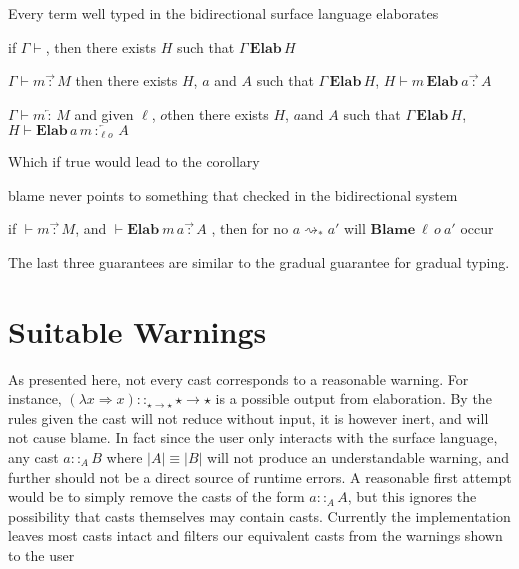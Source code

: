 \begin{conjecture}
Every term well typed in the bidirectional surface language elaborates 

if $\Gamma\vdash$, then there exists $H$ such that $\Gamma\,\textbf{Elab}\,H$ 

$\Gamma\vdash m\overrightarrow{\,:\,}M$ then there exists $H$, $a$
and $A$ such that $\Gamma\,\textbf{Elab}\,H$, $H\vdash m\,\textbf{Elab}\ a\overrightarrow{\,:\,}A$ 

$\Gamma\vdash m\overleftarrow{\,:\,}M$ and given $\ell$, $o$then
there exists $H$, $a$and $A$ such that $\Gamma\,\textbf{Elab}\,H$,
$H\vdash\textbf{Elab}\,a\,m\overleftarrow{\,:_{\ell o}\,}A$ 
\end{conjecture}

Which if true would lead to the corollary
\begin{conjecture}
blame never points to something that checked in the bidirectional
system 

if $\vdash m\overrightarrow{\,:\,}M$, and $\vdash\textbf{Elab}\ m\,a\overrightarrow{\,:\,}A$
, then for no $a\rightsquigarrow_{*}a'$ will $\textbf{Blame}\:\ensuremath{\ell}\,o\:a'$
occur 

\end{conjecture}

The last three guarantees are similar to the gradual guarantee \cite{siek_et_al:LIPIcs:2015:5031}
for gradual typing. 

\section{Suitable Warnings}

As presented here, not every cast corresponds to a reasonable warning.
For instance, $\left(\lambda x\Rightarrow x\right)::_{\star\rightarrow\star}\star\rightarrow\star$
is a possible output from elaboration. By the rules given the cast
will not reduce without input, it is however inert, and will not cause
blame. In fact since the user only interacts with the surface language,
any cast $a::_{A}B$ where $|A|\equiv|B|$ will not produce an understandable
warning, and further should not be a direct source of runtime errors.
A reasonable first attempt would be to simply remove the casts of
the form $a::_{A}A$, but this ignores the possibility that casts
themselves may contain casts. Currently the implementation
leaves most casts intact and filters our equivalent casts from the
warnings shown to the user


